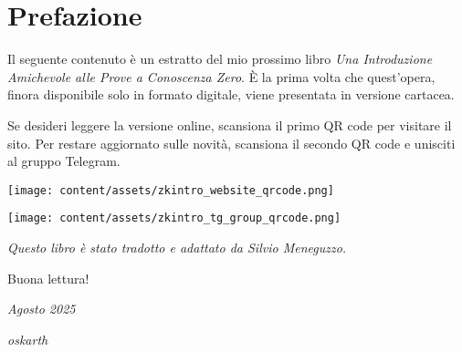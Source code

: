\setlength{\parskip}{0.25em}

\section*{Prefazione}
\vspace{0.4cm}

Il seguente contenuto è un estratto del mio prossimo libro
\textit{Una Introduzione Amichevole alle Prove a Conoscenza Zero}.
È la prima volta che quest'opera, finora disponibile solo in formato
digitale, viene presentata in versione cartacea.

Se desideri leggere la versione online, scansiona il primo QR code
per visitare il sito.  Per restare aggiornato sulle novità,
scansiona il secondo QR code e unisciti al gruppo Telegram.

\vspace{0.2cm}
\begin{center}
\texttt{[image: content/assets/zkintro\_website\_qrcode.png]}
\end{center}
\vspace{0.15cm}
\begin{center}
\texttt{[image: content/assets/zkintro\_tg\_group\_qrcode.png]}
\end{center}
\vspace{0.15cm}

\textit{Questo libro è stato tradotto e adattato da Silvio Meneguzzo.}

\vspace{0.3cm}
Buona lettura!

\textit{Agosto 2025}

\textit{oskarth}

\thispagestyle{empty}